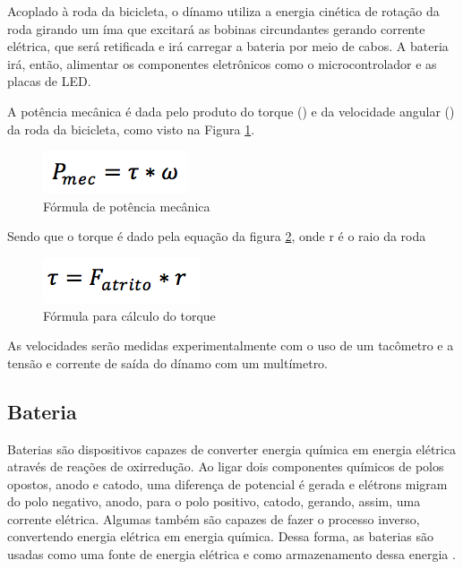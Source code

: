 Acoplado à roda da bicicleta, o dínamo utiliza a energia cinética de rotação da roda girando um íma que excitará as bobinas circundantes gerando corrente elétrica, que será retificada e irá carregar a bateria por meio de cabos. A bateria irá, então, alimentar os componentes eletrônicos como o microcontrolador e as placas de LED.

A potência mecânica é dada pelo produto do torque () e da velocidade angular () da roda da bicicleta, como visto na Figura \ref{img:potencia_mecanica}. 

\graphicspath{{figuras/}}
\begin{figure}[h!]
\centering
\includegraphics[scale=1.0]{potencia_mecanica}
\caption{Fórmula de potência mecânica}
\label{img:potencia_mecanica}
\end{figure}

Sendo que o torque é dado pela equação da figura \ref{img:torque}, onde r é o raio da roda

\graphicspath{{figuras/}}
\begin{figure}[h!]
\centering
\includegraphics[scale=1.0]{torque}
\caption{Fórmula para cálculo do torque}
\label{img:torque}
\end{figure}


As velocidades serão medidas experimentalmente com o uso de um tacômetro e a tensão e corrente de saída do dínamo com um multímetro.
  
\subsection{Bateria}
	Baterias são dispositivos capazes de converter energia química em energia elétrica através de reações de oxirredução. Ao ligar dois componentes químicos de polos opostos, anodo e catodo, uma diferença de potencial é gerada e elétrons migram do polo negativo, anodo, para o polo positivo, catodo, gerando, assim, uma corrente elétrica. Algumas também são capazes de fazer o processo inverso, convertendo energia elétrica em energia química. Dessa forma, as baterias são usadas como uma fonte de energia elétrica e como armazenamento dessa energia \cite{varela}.
	
